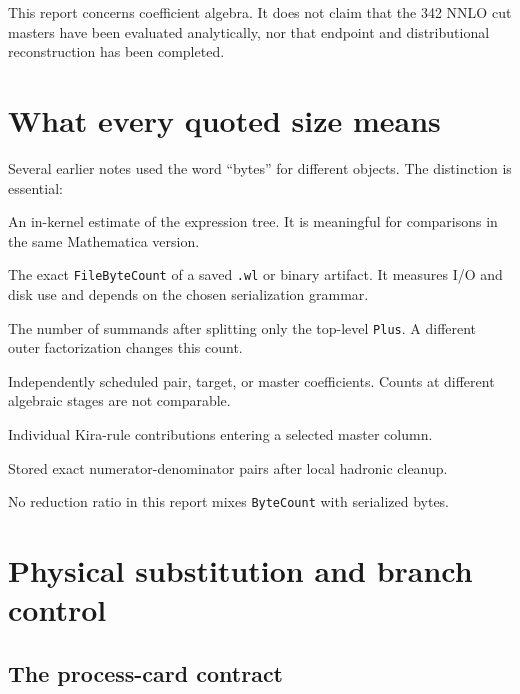 \documentclass[11pt]{article}
\newcommand{\code}[1]{\texttt{#1}}
\begin{document}
This report concerns coefficient algebra.  It does not claim that the 342
NNLO cut masters have been evaluated analytically, nor that endpoint and
distributional reconstruction has been completed.

\section{What every quoted size means}

Several earlier notes used the word ``bytes'' for different objects.  The
distinction is essential:
\begin{description}[leftmargin=3.1cm,style=nextline]
  \item[Mathematica \code{ByteCount}] An in-kernel estimate of the expression
  tree.  It is meaningful for comparisons in the same Mathematica version.
  \item[Serialized bytes] The exact \code{FileByteCount} of a saved \code{.wl}
  or binary artifact.  It measures I/O and disk use and depends on the chosen
  serialization grammar.
  \item[Additive terms] The number of summands after splitting only the
  top-level \code{Plus}.  A different outer factorization changes this count.
  \item[Objects] Independently scheduled pair, target, or master
  coefficients.  Counts at different algebraic stages are not comparable.
  \item[Target leaves] Individual Kira-rule contributions entering a selected
  master column.
  \item[Fractions] Stored exact numerator-denominator pairs after local
  hadronic cleanup.
\end{description}
No reduction ratio in this report mixes \code{ByteCount} with serialized
bytes.

\section{Physical substitution and branch control}

\subsection{The process-card contract}
\end{document}
